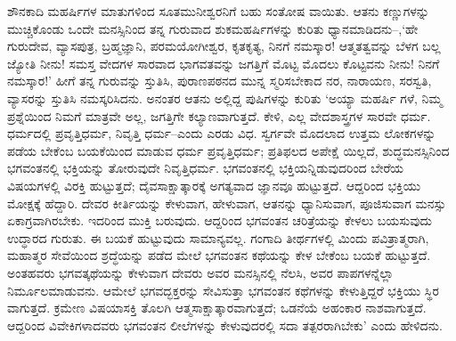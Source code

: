 ಶೌನಕಾದಿ ಮಹರ್ಷಿಗಳ ಮಾತುಗಳಿಂದ ಸೂತಮುನೀಶ್ವರನಿಗೆ ಬಹು ಸಂತೋಷ ವಾಯಿತು. ಆತನು ಕಣ್ಣುಗಳನ್ನು ಮುಚ್ಚಿಕೊಂಡು ಒಂದೇ ಮನಸ್ಸಿನಿಂದ ತನ್ನ ಗುರುವಾದ ಶುಕಮಹರ್ಷಿಗಳನ್ನು ಕುರಿತು ಧ್ಯಾನಮಾಡಿದನು–,‘ಹೇ ಗುರುದೇವ, ವ್ಯಾಸಪುತ್ರ, ಬ್ರಹ್ಮಜ್ಞಾನಿ, ಪರಮಯೋಗೀಶ್ವರ, ಕೃತಕೃತ್ಯ, ನಿನಗೆ ನಮಸ್ಕಾರ! ಆತ್ಮತತ್ವವನ್ನು ಬೆಳಗ ಬಲ್ಲ ಜ್ಯೋತಿ ನೀನು! ಸಮಸ್ತ ವೇದಗಳ ಸಾರವಾದ ಭಾಗವತವನ್ನು ಜಗತ್ತಿಗೆ ಮೊಟ್ಟ ಮೊದಲು ಕೊಟ್ಟವನು ನೀನು! ನಿನಗೆ ನಮಸ್ಕಾರ!’ ಹೀಗೆ ತನ್ನ ಗುರುವನ್ನು ಸ್ತುತಿಸಿ, ಪುರಾಣಪಠನದ ಮುನ್ನ ಸ್ಮರಿಸಬೇಕಾದ ನರ, ನಾರಾಯಣ, ಸರಸ್ವತಿ, ವ್ಯಾಸರನ್ನು ಸ್ತುತಿಸಿ ನಮಸ್ಕರಿಸಿದನು. ಅನಂತರ ಆತನು ಅಲ್ಲಿದ್ದ ಪುಷಿಗಳನ್ನು ಕುರಿತು ‘ಅಯ್ಯಾ ಮಹರ್ಷಿ ಗಳೆ, ನಿಮ್ಮ ಪ್ರಶ್ನೆಯಿಂದ ನಿಮಗೆ ಮಾತ್ರವೇ ಅಲ್ಲ, ಜಗತ್ತಿಗೇ ಕಲ್ಯಾಣವಾಗುತ್ತದೆ. ಕೇಳಿ, ಎಲ್ಲ ವೇದಶಾಸ್ತ್ರಗಳ ಸಾರವೇ ಧರ್ಮ. ಧರ್ಮದಲ್ಲಿ ಪ್ರವೃತ್ತಿಧರ್ಮ, ನಿವೃತ್ತಿ ಧರ್ಮ–ಎಂದು ಎರಡು ವಿಧ. ಸ್ವರ್ಗವೇ ಮೊದಲಾದ ಉತ್ತಮ ಲೋಕಗಳನ್ನು ಪಡೆಯ ಬೇಕೆಂಬ ಬಯಕೆಯಿಂದ ಮಾಡುವ ಧರ್ಮ ಪ್ರವೃತ್ತಿಧರ್ಮ; ಪ್ರತಿಫಲದ ಅಪೇಕ್ಷೆ ಯಿಲ್ಲದೆ, ಶುದ್ಧಮನಸ್ಸಿನಿಂದ ಭಗವಂತನಲ್ಲಿ ಭಕ್ತಿಯನ್ನು ತೋರುವುದೇ ನಿವೃತ್ತಿಧರ್ಮ. ಭಗವಂತನಲ್ಲಿ ಭಕ್ತಿಯನ್ನಿಡುವುದರಿಂದ ಬೇರೆಯ ವಿಷಯಗಳಲ್ಲಿ ವಿರಕ್ತಿ ಹುಟ್ಟುತ್ತದೆ; ದೈವಸಾಕ್ಷಾತ್ಕಾರಕ್ಕೆ ಅಗತ್ಯವಾದ ಜ್ಞಾನವೂ ಹುಟ್ಟುತ್ತದೆ. ಆದ್ದರಿಂದ ಭಕ್ತಿಯು ಮೋಕ್ಷಕ್ಕೆ ಹೆದ್ದಾರಿ. ದೇವರ ಕೀರ್ತಿಯನ್ನು ಕೇಳುವಾಗ, ಹೇಳುವಾಗ, ಆತನನ್ನು ಧ್ಯಾನಿಸುವಾಗ, ಪೂಜಿಸುವಾಗ ಮನಸ್ಸು ಏಕಾಗ್ರವಾಗಿರಬೇಕು. ಇದರಿಂದ ಮುಕ್ತಿ ಬರುವುದು. ಆದ್ದರಿಂದ ಭಗವಂತನ ಚರಿತ್ರೆಯನ್ನು ಕೇಳಲು ಬಯಸುವುದು ಉದ್ಧಾರದ ಗುರುತು. ಈ ಬಯಕೆ ಹುಟ್ಟುವುದು ಸಾಮಾನ್ಯವಲ್ಲ. ಗಂಗಾದಿ ತೀರ್ಥಗಳಲ್ಲಿ ಮಿಂದು ಪವಿತ್ರಾತ್ಮರಾಗಿ, ಮಹಾತ್ಮರ ಸೇವೆಯಿಂದ ಶ್ರದ್ಧೆಯನ್ನು ಪಡೆದ ಮೇಲೆ ಭಗವಂತನ ಕಥೆಯನ್ನು ಕೇಳ ಬೇಕೆಂಬ ಬಯಕೆ ಹುಟ್ಟುತ್ತದೆ. ಅಂತಹವರು ಭಗವತ್ಕಥೆಯನ್ನು ಕೇಳುವಾಗ ದೇವರು ಅವರ ಮನಸ್ಸಿನಲ್ಲಿ ನೆಲಸಿ, ಅವರ ಪಾಪಗಳನ್ನೆಲ್ಲಾ ನಿರ್ಮೂಲಮಾಡುವನು. ಆಮೇಲೆ ಭಗವದ್ಭಕ್ತರನ್ನು ಸೇವಿಸುತ್ತಾ ಭಗವಂತನ ಕಥೆಗಳನ್ನು ಕೇಳುತ್ತಿದ್ದರೆ ಭಕ್ತಿಯು ಸ್ಥಿರ ವಾಗುತ್ತದೆ. ಕ್ರಮೇಣ ವಿಷಯಾಸಕ್ತಿ ತೊಲಗಿ ಆತ್ಮಸಾಕ್ಷಾತ್ಕಾರವಾಗುತ್ತದೆ; ಒಡನೆಯೆ ಅಹಂಕಾರ ನಾಶವಾಗುತ್ತದೆ. ಆದ್ದರಿಂದ ವಿವೇಕಿಗಳಾದವರು ಭಗವಂತನ ಲೀಲೆಗಳನ್ನು ಕೇಳುವುದರಲ್ಲಿ ಸದಾ ತತ್ಪರರಾಗಿಬೇಕು’ ಎಂದು ಹೇಳಿದನು.

